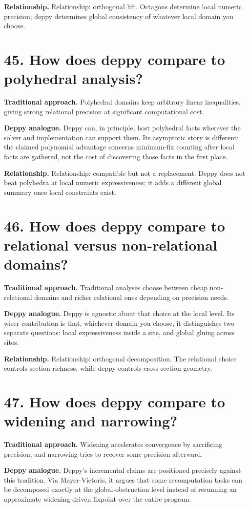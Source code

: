 \documentclass[11pt,openany]{book}
\begin{document}
\textbf{Relationship.} Relationship: orthogonal lift. Octagons determine local numeric precision; deppy determines global consistency of whatever local domain you choose.

\section*{45. How does deppy compare to polyhedral analysis?}
\textbf{Traditional approach.} Polyhedral domains keep arbitrary linear inequalities, giving strong relational precision at significant computational cost.

\textbf{Deppy analogue.} Deppy can, in principle, host polyhedral facts wherever the solver and implementation can support them. Its asymptotic story is different: the claimed polynomial advantage concerns minimum-fix counting after local facts are gathered, not the cost of discovering those facts in the first place.

\textbf{Relationship.} Relationship: compatible but not a replacement. Deppy does not beat polyhedra at local numeric expressiveness; it adds a different global summary once local constraints exist.

\section*{46. How does deppy compare to relational versus non-relational domains?}
\textbf{Traditional approach.} Traditional analyses choose between cheap non-relational domains and richer relational ones depending on precision needs.

\textbf{Deppy analogue.} Deppy is agnostic about that choice at the local level. Its wiser contribution is that, whichever domain you choose, it distinguishes two separate questions: local expressiveness inside a site, and global gluing across sites.

\textbf{Relationship.} Relationship: orthogonal decomposition. The relational choice controls section richness, while deppy controls cross-section geometry.

\section*{47. How does deppy compare to widening and narrowing?}
\textbf{Traditional approach.} Widening accelerates convergence by sacrificing precision, and narrowing tries to recover some precision afterward.

\textbf{Deppy analogue.} Deppy's incremental claims are positioned precisely against this tradition. Via Mayer-Vietoris, it argues that some recomputation tasks can be decomposed exactly at the global-obstruction level instead of rerunning an approximate widening-driven fixpoint over the entire program.
\end{document}
